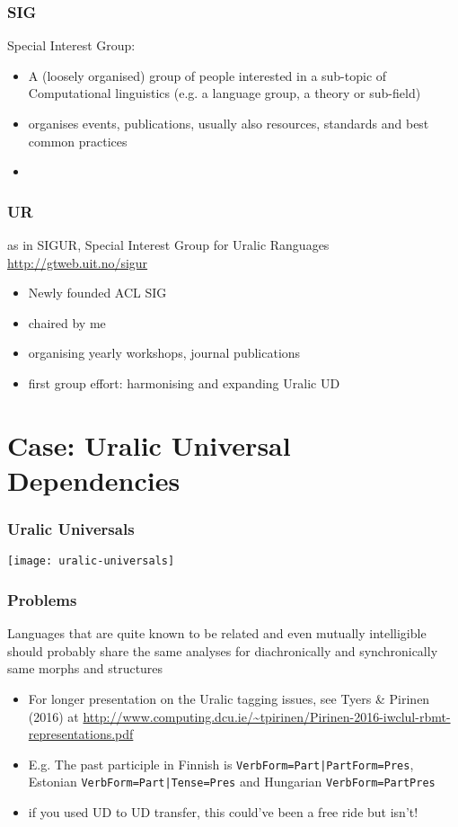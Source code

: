 \documentclass{beamer}
\begin{document}
\begin{frame}
    \frametitle{SIG}
    Special Interest Group:
    \begin{itemize}
        \item A (loosely organised) group of people interested in a
            sub-topic of Computational linguistics (e.g. a language
            group, a theory or sub-field)
        \item organises events, publications, usually also resources,
            standards and best common practices
        \item 
    \end{itemize}
\end{frame}

\begin{frame}
    \frametitle{UR}
    as in SIGUR, Special Interest Group for Uralic Ranguages
    \url{http://gtweb.uit.no/sigur}
    \begin{itemize}
        \item Newly founded ACL SIG
        \item chaired by me
        \item organising yearly workshops, journal publications
        \item first group effort: harmonising and expanding Uralic UD
    \end{itemize}
\end{frame}


\section{Case: Uralic Universal Dependencies}

\begin{frame}
    \frametitle{Uralic Universals}
    \texttt{[image: uralic-universals]}
\end{frame}

\begin{frame}
    \frametitle{Problems}
    Languages that are quite known to be related and even mutually intelligible
    should probably share the same analyses for diachronically and synchronically
    same morphs and structures
    \begin{itemize}
        \item For longer presentation on the Uralic tagging issues,
            see Tyers \& Pirinen (2016) at
            \url{http://www.computing.dcu.ie/~tpirinen/Pirinen-2016-iwclul-rbmt-representations.pdf}
        \item E.g. The past participle in Finnish is 
            \texttt{VerbForm=Part|PartForm=Pres}, Estonian 
            \texttt{VerbForm=Part|Tense=Pres} and Hungarian \texttt{VerbForm=PartPres}
        \item if you used UD to UD transfer, this could've been a free ride but
            isn't!
    \end{itemize}
\end{frame}
\end{document}
